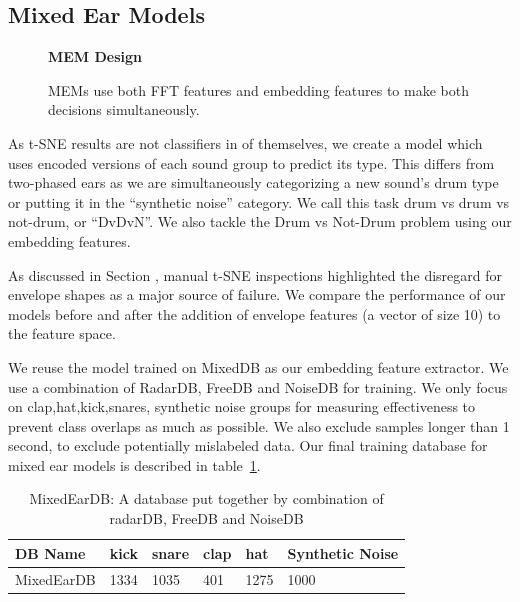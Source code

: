 \documentclass[\main/thesis.tex]{subfiles}
\begin{document}
\subsection{Mixed Ear Models}

\begin{figure}[t!]
    \begin{center}
    \textbf{MEM Design}
    \end{center}
    \caption{MEMs use both FFT features and embedding features to make both decisions simultaneously. }
\label{fig:TPE_design}
\end{figure}
\label{chap3:mixed_ear_models}
As t-SNE results are not classifiers in of themselves, we create a model which uses encoded versions of each sound group to predict its type. This differs from two-phased ears as we are simultaneously categorizing a new sound's drum type or putting it in the \enquote{synthetic noise} category. We call this task drum vs drum vs not-drum, or \enquote{DvDvN}. We also tackle the Drum vs Not-Drum problem using our embedding features.

As discussed in Section \label{fig:embedding_FE}, manual t-SNE inspections highlighted the disregard for envelope shapes as a major source of failure. We compare the performance of our models before and after the addition of envelope features (a vector of size 10) to the feature space. 

We reuse the model trained on  MixedDB as our embedding feature extractor. We use a combination of RadarDB, FreeDB and NoiseDB for training. We only focus on clap,hat,kick,snares, synthetic noise groups for measuring effectiveness to prevent class overlaps as much as possible. We also exclude samples longer than 1 second, to exclude potentially mislabeled data. Our final training database for mixed ear models is described in table~\ref{db:memDB}.
\begin{table}[htbp]
\centering
\begin{tabular}{|l|l|l|l|l|l|}
\hline
 DB Name & kick & snare & clap & hat & Synthetic Noise\\\hline
 MixedEarDB & 1334 & 1035 & 401 & 1275 & 1000 \\ \hline
\end{tabular}
\caption{MixedEarDB: A database put together by combination of radarDB, FreeDB and NoiseDB}
\label{db:memDB}
\end{table}
\end{document}
